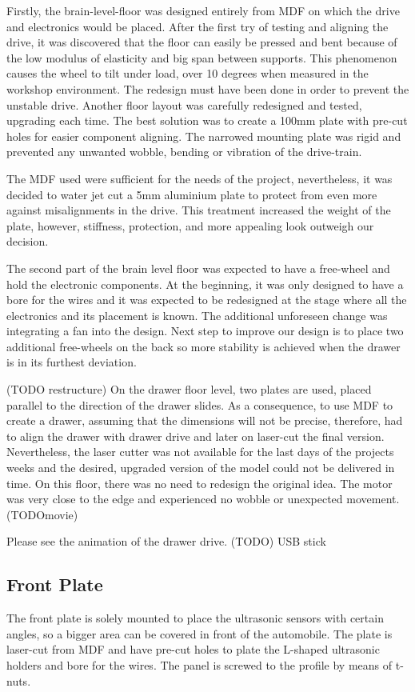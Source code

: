 \documentclass[11pt]{article}
\begin{document}
Firstly, the brain-level-floor was designed entirely from MDF on which the drive and electronics would be placed. After the first try of testing and aligning the drive, it was discovered that the floor can easily be pressed and bent because of the low modulus of elasticity and big span between supports. This phenomenon causes the wheel to tilt under load, over 10 degrees when measured in the workshop environment. The redesign must have been done in order to prevent the unstable drive. Another floor layout was carefully redesigned and tested, upgrading each time. The best solution was to create a 100mm plate with pre-cut holes for easier component aligning. The narrowed mounting plate was rigid and prevented any unwanted wobble, bending or vibration of the drive-train.


The MDF used were sufficient for the needs of the project, nevertheless, it was decided to water jet cut a 5mm aluminium plate to protect from even more against misalignments in the drive. This treatment increased the weight of the plate, however, stiffness, protection, and more appealing look outweigh our decision.


The second part of the brain level floor was expected to have a free-wheel and hold the electronic components. At the beginning, it was only designed to have a bore for the wires and it was expected to be redesigned at the stage where all the electronics and its placement is known. The additional unforeseen change was integrating a fan into the design. Next step to improve our design is to place two additional free-wheels on the back so more stability is achieved when the drawer is in its furthest deviation.


(TODO restructure) On the drawer floor level, two plates are used, placed parallel to the direction of the drawer slides. As a consequence, to use MDF to create a drawer, assuming that the dimensions will not be precise, therefore,  had to align the drawer with drawer drive and later on laser-cut the final version. Nevertheless, the laser cutter was not available for the last days of the projects weeks and the desired, upgraded version of the model could not be delivered in time. On this floor, there was no need to redesign the original idea. The motor was very close to the edge and experienced no wobble or unexpected movement. (TODOmovie)


Please see the animation of the drawer drive. (TODO)
USB stick


\subsection*{Front Plate}
The front plate is solely mounted to place the ultrasonic sensors with certain angles, so a bigger area can be covered in front of the automobile. The plate is laser-cut from MDF and have pre-cut holes to plate the L-shaped ultrasonic holders and bore for the wires. The panel is screwed to the profile by means of t-nuts. 
\end{document}
